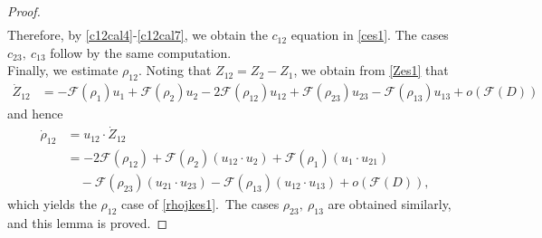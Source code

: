 \documentclass[reqno]{amsart}
\theoremstyle{plain}
\theoremstyle{definition}
\numberwithin{equation}{section}
\newcommand{\1}{\mathbbm{1}}
\begin{document}
\begin{proof}
\begin{align}
\end{align}
Therefore, by \eqref{c12cal4}-\eqref{c12cal7}, we obtain the $c_{12}$ equation in \eqref{ces1}. The cases $c_{23},\ c_{13}$ follow by the same computation.
\\
Finally, we estimate $\rho_{12}$. Noting that $Z_{12}=Z_2-Z_1$, we obtain from \eqref{Zes1} that
\begin{align*}
\dot{Z}_{12}&=-\mathcal{F}(\rho_1)u_1+\mathcal{F}(\rho_2)u_2-2\mathcal{F}(\rho_{12})u_{12}+\mathcal{F}(\rho_{23})u_{23}-\mathcal{F}(\rho_{13})u_{13}+o\left(\mathcal{F}(D)\right)
\end{align*}
and hence
\begin{align*}
\dot{\rho}_{12}&=u_{12}\cdot \dot{Z}_{12}
\\
&=-2\mathcal{F}(\rho_{12})+\mathcal{F}(\rho_2)(u_{12}\cdot u_2)+\mathcal{F}(\rho_1)(u_1\cdot u_{21})
\\
&\quad -\mathcal{F}(\rho_{23})(u_{21}\cdot u_{23})-\mathcal{F}(\rho_{13})(u_{12}\cdot u_{13})+o\left(\mathcal{F}(D)\right),
\end{align*}
which yields the $\rho_{12}$ case of \eqref{rhojkes1}.\ The cases $\rho_{23},\ \rho_{13}$ are obtained similarly, and this lemma is proved.
\end{proof}
\end{document}
